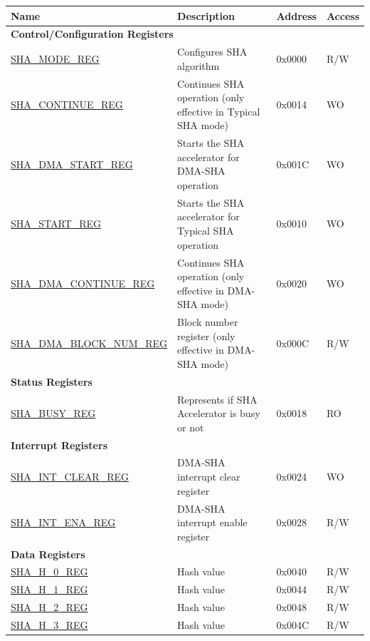 \begin{longtable}{ | l | l | l |l | }
\hline\rowcolor{lightgray}
\textbf{Name} & \textbf{Description} &  \textbf{Address} & \textbf{Access} \\ \hline
\endhead
\multicolumn{4}{|l|}{\textbf{Control/Configuration Registers}} \\ \hline
\hyperref[regdesc:SHAMODEREG]{SHA\_MODE\_REG} & Configures SHA algorithm & 0x0000 & R/W \\ \hline
\hyperref[regdesc:SHACONTINUEREG]{SHA\_CONTINUE\_REG} & Continues SHA operation (only effective in Typical SHA mode) & 0x0014 & WO \\ \hline
\hyperref[regdesc:SHADMASTARTREG]{SHA\_DMA\_START\_REG} & Starts the SHA accelerator for DMA-SHA operation & 0x001C & WO \\ \hline
\hyperref[regdesc:SHASTARTREG]{SHA\_START\_REG} & Starts the SHA accelerator for Typical SHA operation & 0x0010 & WO \\ \hline
\hyperref[regdesc:SHADMACONTINUEREG]{SHA\_DMA\_CONTINUE\_REG} & Continues SHA operation (only effective in DMA-SHA mode) & 0x0020 & WO \\ \hline
\hyperref[regdesc:SHADMABLOCKNUMREG]{SHA\_DMA\_BLOCK\_NUM\_REG} & Block number register (only effective in DMA-SHA mode) & 0x000C & R/W \\ \hline
\multicolumn{4}{|l|}{\textbf{Status Registers}} \\ \hline
\hyperref[regdesc:SHABUSYREG]{SHA\_BUSY\_REG} & Represents if SHA Accelerator is busy or not & 0x0018 & RO \\ \hline
\multicolumn{4}{|l|}{\textbf{Interrupt Registers}} \\ \hline
\hyperref[regdesc:SHAINTCLEARREG]{SHA\_INT\_CLEAR\_REG} & DMA-SHA interrupt clear register & 0x0024 & WO \\ \hline
\hyperref[regdesc:SHAINTENAREG]{SHA\_INT\_ENA\_REG} & DMA-SHA interrupt enable register & 0x0028 & R/W \\ \hline
\multicolumn{4}{|l|}{\textbf{Data Registers}} \\ \hline
\hyperref[regdesc:SHAHNREG]{SHA\_H\_0\_REG} & Hash value & 0x0040 & R/W \\ \hline
\hyperref[regdesc:SHAHNREG]{SHA\_H\_1\_REG} & Hash value & 0x0044 & R/W \\ \hline
\hyperref[regdesc:SHAHNREG]{SHA\_H\_2\_REG} & Hash value & 0x0048 & R/W \\ \hline
\hyperref[regdesc:SHAHNREG]{SHA\_H\_3\_REG} & Hash value & 0x004C & R/W \\ \hline

\end{longtable}

